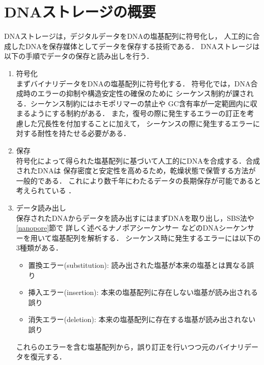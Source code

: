 \documentclass[sotsuron]{kuee}
\begin{document}
\section{DNAストレージの概要} \label{dna_storage}
DNAストレージは，デジタルデータをDNAの塩基配列に符号化し，
人工的に合成したDNAを保存媒体としてデータを保存する技術である．
DNAストレージは以下の手順でデータの保存と読み出しを行う．
\begin{enumerate}
  \item 符号化\\
  まずバイナリデータをDNAの塩基配列に符号化する．
  符号化では，DNA合成時のエラーの抑制や構造安定性の確保のために
  シーケンス制約が課される．シーケンス制約にはホモポリマーの禁止や
  GC含有率が一定範囲内に収まるようにする制約がある\cite{Gervasio}．
  また，復号の際に発生するエラーの訂正を考慮した冗長性を付加することに加えて，
  シーケンスの際に発生するエラーに対する耐性を持たせる必要がある．
  \item 保存\\
  符号化によって得られた塩基配列に基づいて人工的にDNAを合成する．合成されたDNAは
  保存密度と安定性を高めるため，乾燥状態で保管する方法が一般的である\cite{landsman2023the}．
  これにより数千年にわたるデータの長期保存が可能であると考えられている
  \cite{Grass2015Robust}．
  \item データ読み出し\\
  保存されたDNAからデータを読み出すにはまずDNAを取り出し，SBS法や\ref{nanopore}節で
  詳しく述べるナノポアシーケンサー
  などのDNAシーケンサーを用いて塩基配列を解析する．
  シーケンス時に発生するエラーには以下の3種類がある．
  \begin{itemize}
    \item 置換エラー(substitution): 読み出された塩基が本来の塩基とは異なる誤り
    \item 挿入エラー(insertion): 本来の塩基配列に存在しない塩基が読み出される誤り
    \item 消失エラー(deletion): 本来の塩基配列に存在する塩基が読み出されない誤り
  \end{itemize}
  これらのエラーを含む塩基配列から，誤り訂正を行いつつ元のバイナリデータを復元する．
\end{enumerate}
\end{document}
